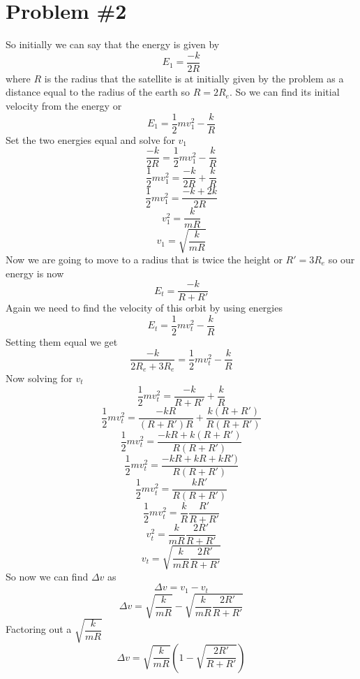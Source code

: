 \documentclass[11pt]{article}
\numberwithin{equation}{section}
\begin{document}
\section{Problem \#2}
So initially we can say that the energy is given by
$$E_1 = \frac{-k}{2R}$$ 
where $R$ is the radius that the satellite is at initially given by the problem as a distance equal to the radius of the earth so $R=2R_e$. So we can find its initial velocity from the energy or
$$E_1 = \frac{1}{2}mv_1^2-\frac{k}{R}$$
Set the two energies equal and solve for $v_1$
$$\frac{-k}{2R} = \frac{1}{2}mv_1^2-\frac{k}{R}$$
$$\frac{1}{2}mv_1^2 = \frac{-k}{2R}+\frac{k}{R}$$
$$\frac{1}{2}mv_1^2 = \frac{-k+2k}{2R}$$
$$ v_1^2 = \frac{k}{mR}$$
$$v_1 = \sqrt{\frac{k}{mR}}$$
Now we are going to move to a radius that is twice the height or $R'=3R_e$ so our energy is now
$$E_t = \frac{-k}{R+R'}$$
Again we need to find the velocity of this orbit by using energies
$$E_t = \frac{1}{2}mv_t^2 -\frac{k}{R}$$
Setting them equal we get
$$\frac{-k}{2R_e+3R_e} = \frac{1}{2}mv_t^2 -\frac{k}{R}$$
Now solving for $v_t$
$$ \frac{1}{2}mv_t^2 = \frac{-k}{R+R'} +\frac{k}{R}$$
$$ \frac{1}{2}mv_t^2 = \frac{-kR}{(R+R')R} +\frac{k(R+R')}{R(R+R')}$$
$$ \frac{1}{2}mv_t^2 = \frac{-kR + k(R+R')}{R(R+R')}$$
$$ \frac{1}{2}mv_t^2 = \frac{-kR + kR + kR')}{R(R+R')}$$
$$ \frac{1}{2}mv_t^2 = \frac{kR'}{R(R+R')}$$
$$ \frac{1}{2}mv_t^2 = \frac{k}{R}\frac{R'}{R+R'}$$
$$ v_t^2 = \frac{k}{mR}\frac{2R'}{R+R'}$$
$$ v_t = \sqrt{\frac{k}{mR}\frac{2R'}{R+R'}}$$
So now we can find $\Delta v$ as
$$\Delta v = v_1 - v_t$$
$$\Delta v = \sqrt{\frac{k}{mR}} - \sqrt{\frac{k}{mR}\frac{2R'}{R+R'}}$$
Factoring out a $\sqrt{\dfrac{k}{mR}}$
$$\Delta v = \sqrt{\frac{k}{mR}} \left(1 - \sqrt{\frac{2R'}{R+R'}}\right)$$
\end{document}
